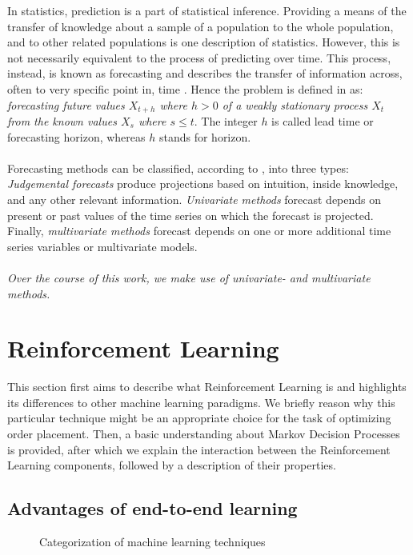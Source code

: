 In statistics, prediction is a part of statistical inference. 
Providing a means of the transfer of knowledge about a sample of a population to the whole population, and to other related populations is one description of statistics. 
However, this is not necessarily equivalent to the process of predicting over time. 
This process, instead, is known as forecasting and describes the transfer of information across, often to very specific point in, time \cite{wiki-timeseries}.
Hence the problem is defined in \cite{ito1993encyclopedic} as: \textit{forecasting future values $X_{t+h}$ where $h > 0$ of a weakly stationary process ${X_t}$ from the known values $X_s$ where $s \leq t$}. 
The integer $h$ is called lead time or forecasting horizon, whereas $h$ stands for horizon.
\\
\\
Forecasting methods can be classified, according to \cite{chatfield2000time}, into three types: \textit{Judgemental forecasts} produce projections based on intuition, inside knowledge, and any other relevant information.
\textit{Univariate methods} forecast depends on present or past values of the time series on which the forecast is projected.
Finally, \textit{multivariate methods} forecast depends on one or more additional time series variables or multivariate models.
\\
\\
\textit{Over the course of this work, we make use of univariate- and multivariate methods.}

\section{Reinforcement Learning}
\label{sec:reinforcement-learning}

This section first aims to describe what Reinforcement Learning is and highlights its differences to other machine learning paradigms. 
We briefly reason why this particular technique might be an appropriate choice for the task of optimizing order placement. 
Then, a basic understanding about Markov Decision Processes is provided, after which we explain the interaction between the Reinforcement Learning components, followed by a description of their properties.

\subsection{Advantages of end-to-end learning}

\begin{figure}[H]
    \centering
    \caption{Categorization of machine learning techniques}
    \label{fig:ml-rl}
\end{figure}

